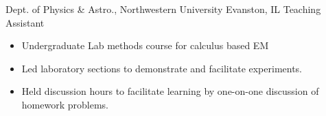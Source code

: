 
        {Dept. of Physics \& Astro., Northwestern University}
        {Evanston, IL}
        {Teaching Assistant}
        {}{
    \begin{itemize}
    	\item Undergraduate Lab methods course for calculus based EM
        \item Led laboratory sections to demonstrate and facilitate experiments. 
        \item Held discussion hours to facilitate learning by one-on-one discussion of homework problems.
    \end{itemize}
}
